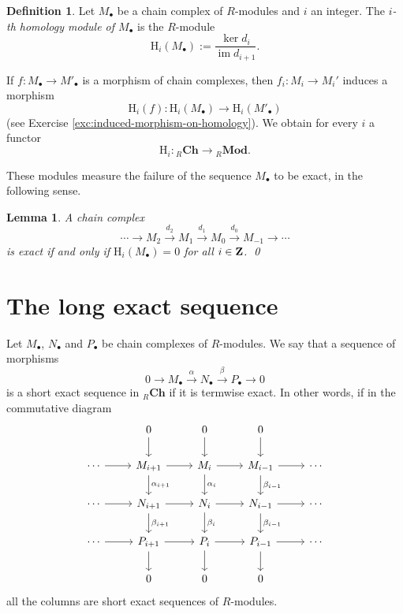 \documentclass[11pt]{amsbook}
\newcommand{\longto}{\longrightarrow}
\DeclareMathOperator\Mod{{\bf{Mod}}}
\DeclareMathOperator\im{im}
\def\rH{{\mathrm H}} \def\rK{{\mathrm K}} \def\rR{{\mathrm R}}
\def\Mod{\mathbf{Mod}}
\def\Ch{\mathbf{Ch}}
\theoremstyle{plain}
\newtheorem{lemma}[theorem]{Lemma}
\theoremstyle{definition}
\newtheorem{definition}[theorem]{Definition}
\begin{document}
\begin{definition}
Let $M_\bullet$ be a chain complex of $R$-modules and $i$ an integer. The \emph{$i$-th homology module of $M_\bullet$} is the $R$-module
\[
	\rH_i(M_\bullet) := \frac{\ker d_i}{\im d_{i+1}}.
\]
\end{definition}

If $f\colon M_\bullet \to M'_\bullet$ is a morphism of chain complexes, then $f_i\colon M_i \to M_i'$ induces a morphism
\[
	\rH_i(f)  \colon \rH_i(M_\bullet) \to \rH_i(M'_\bullet)
\]
(see Exercise \ref{exc:induced-morphism-on-homology}). We obtain for every $i$ a functor
\[
	\rH_i \colon {}_R\Ch \to {}_R\Mod.
\]

These modules measure the failure of the sequence $M_\bullet$ to be exact, in the following sense.

\begin{lemma}
A chain complex
\[
	\cdots \longto M_2 \overset{d_2}{\longto} M_1 \overset{d_1}{\longto}  M_0 
	\overset{d_0}{\longto} M_{-1} \longto \cdots 
\]
is exact if and only if $\rH_i(M_\bullet)=0$ for all $i\in {\mathbf{Z}}$. \qed
\end{lemma}

\section{The long exact sequence}

Let $M_\bullet$, $N_\bullet$ and $P_\bullet$ be chain complexes of $R$-modules. 
We say that a sequence of morphisms  
\[
	0 \longto M_\bullet \overset{\alpha}{\longto} N_\bullet 
	\overset{\beta}{\longto} P_\bullet \longto 0
\]
is a short exact sequence in ${}_R\Ch$ if it is termwise exact. In other words, 
if in the commutative diagram
\[
\begin{tikzcd}
	& 0  \arrow{d}
	& 0 \arrow{d}
	& 0 \arrow{d}
	&  \\
\cdots \arrow{r}
	& M_{i+1} \arrow{r}{} \arrow{d}{\alpha_{i+1}} 
	& M_{i} \arrow{r}{} \arrow{d}{\alpha_{i}} 
	& M_{i-1} \arrow{r} \arrow{d}{\beta_{i-1}} 
	& \cdots \\
\cdots \arrow{r}
	& N_{i+1} \arrow{r}{} \arrow{d}{\beta_{i+1}} 
	& N_{i} \arrow{r}{} \arrow{d}{\beta_{i}} 
	& N_{i-1} \arrow{r} \arrow{d}{\beta_{i-1}} 
	& \cdots \\
\cdots \arrow{r}
	& P_{i+1} \arrow{r}{} \arrow{d}
	& P_{i} \arrow{r}{}  \arrow{d}
	& P_{i-1} \arrow{r} \arrow{d}
	& \cdots \\
	& 0 
	& 0 
	& 0  
	&  
\end{tikzcd}
\]
all the columns are short exact sequences of $R$-modules. 
\end{document}
